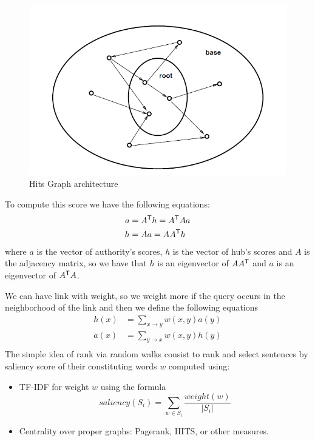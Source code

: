\begin{figure}
	\includegraphics[width=\textwidth]{Images/hits}
	\caption{Hits Graph architecture}
	\label{img:hits}
\end{figure}
To compute this score we have the following equations:
\begin{align*}
	a & = A ^ \mathsf{T} h = A ^ \mathsf{T} Aa \\
	h & = Aa = A A ^ \mathsf{T} h \\
\end{align*}
where $a$ is the vector of authority's scores, $h$ is the vector of 
hub's scores and $A$ is the adjacency matrix, so we have that $h$ is an
eigenvector of $A A ^ \mathsf{T}$ and $a$ is an eigenvector of $A ^ \mathsf{T} A$.

We can have link with weight, so we weight more if the query occurs in the
neighborhood of the link and then we define the following equations
\begin{align*}
	h(x) & = \sum _{x \to y} w(x, y) a(y) \\
	a(x) & = \sum _{y \to x} w(x, y) h(y) \\
\end{align*}
The simple idea of rank via random walks consist to rank and select
sentences by saliency score of their constituting words $w$ computed using:
\begin{itemize}
    \item TF-IDF for weight $w$ using the formula
	    \[ saliency(S_i) = \sum _{w \in S_i} \frac{weight(w)}{|S_i|} \]
    \item Centrality over proper graphs: Pagerank, HITS, or other measures.
\end{itemize}

